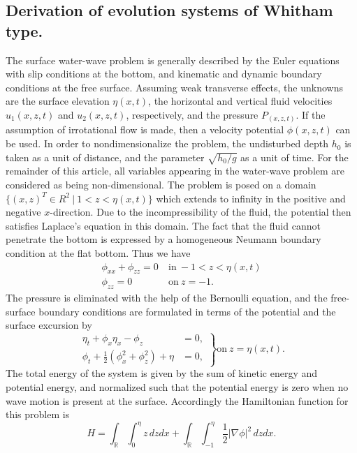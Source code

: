 \subsection{Derivation of evolution systems of Whitham type.}

The surface water-wave problem is generally described by the
Euler equations with slip conditions at the bottom, and kinematic
and dynamic boundary conditions at the free surface. Assuming
weak transverse effects, the unknowns are the surface elevation
$\eta ( x , t )$, the horizontal and vertical fluid velocities $u_1 ( x , z , t )$
and $u_2 ( x , z , t )$, respectively, and the pressure $P_( x , z , t )$. If the
assumption of irrotational flow is made, then a velocity potential
$\phi( x , z , t )$ can be used. In order to nondimensionalize the problem,
the undisturbed depth $h_0$ is taken as a unit of distance, and the
parameter $\sqrt{h_0 / g}$ as a unit of time. For the remainder of this article,
all variables appearing in the water-wave problem are considered
as being non-dimensional. The problem is posed on a domain
$\lbrace( x , z )^T \in R^2 ~|~ 1 < z < \eta( x , t )\rbrace$ which extends to infinity in the
positive and negative $x$-direction. Due to the incompressibility of
the fluid, the potential then satisfies Laplace’s equation in this
domain. The fact that the fluid cannot penetrate the bottom is
expressed by a homogeneous Neumann boundary condition at the
flat bottom. Thus we have
%
\begin{align*}
	\phi_{xx} + \phi_{zz} = 0 ~ &\mbox{in} ~ -1< z < \eta(x,t) \\
	\phi_{zz} = 0 ~ &\mbox{on} ~ z = -1.
\end{align*}
%
The pressure is eliminated with the help of the Bernoulli equation,
and the free-surface boundary conditions are formulated in terms
of the potential and the surface excursion by
%
\begin{equation*}
	\left.
		\begin{array}{rc}
			\eta_t+\phi_x\eta_x-\phi_z
			& =0,
			\\
			\phi_t+\frac{1}{2} \left( \phi^2_x+\phi^2_z \right) + \eta
			& = 0, 
		\end{array}
	\right\}
	\mbox{on} \ z=\eta(x,t).
\end{equation*}
%
The total energy of the system is given by the sum of kinetic energy and potential energy, and normalized such that the potential
energy is zero when no wave motion is present at the surface. Accordingly the Hamiltonian function for this problem is
%
\begin{equation}
	H = \int _{\mathbb{R}} \int_0^\eta z \, dz dx +
	\int _{\mathbb{R}} \int_{-1}^\eta \frac{1}{2} |\nabla \phi|^2 \, dz dx.
\end{equation}
